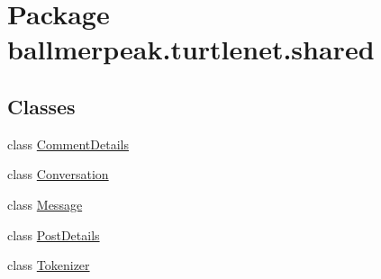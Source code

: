 \hypertarget{namespaceballmerpeak_1_1turtlenet_1_1shared}{\section{Package ballmerpeak.\-turtlenet.\-shared}
\label{namespaceballmerpeak_1_1turtlenet_1_1shared}
}
\subsection*{Classes}
\begin{DoxyCompactItemize}
\item 
class \hyperlink{classballmerpeak_1_1turtlenet_1_1shared_1_1CommentDetails}{Comment\-Details}
\item 
class \hyperlink{classballmerpeak_1_1turtlenet_1_1shared_1_1Conversation}{Conversation}
\item 
class \hyperlink{classballmerpeak_1_1turtlenet_1_1shared_1_1Message}{Message}
\item 
class \hyperlink{classballmerpeak_1_1turtlenet_1_1shared_1_1PostDetails}{Post\-Details}
\item 
class \hyperlink{classballmerpeak_1_1turtlenet_1_1shared_1_1Tokenizer}{Tokenizer}
\end{DoxyCompactItemize}
